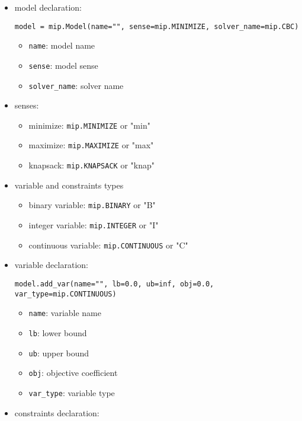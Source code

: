 \documentclass[english]{article}
\begin{document}
\begin{itemize}
  \item model declaration:
        \begin{verbatim}
model = mip.Model(name="", sense=mip.MINIMIZE, solver_name=mip.CBC)
\end{verbatim}
        \begin{itemize}
          \item \texttt{name}: model name
          \item \texttt{sense}: model sense
          \item \texttt{solver\_name}: solver name
        \end{itemize}
  \item senses:
        \begin{itemize}
          \item minimize: \texttt{mip.MINIMIZE} or "min"
          \item maximize: \texttt{mip.MAXIMIZE} or "max"
          \item knapsack: \texttt{mip.KNAPSACK} or "knap"
        \end{itemize}
  \item variable and constraints types
        \begin{itemize}
          \item binary variable: \texttt{mip.BINARY} or "B"
          \item integer variable: \texttt{mip.INTEGER} or "I"
          \item continuous variable: \texttt{mip.CONTINUOUS} or "C"
        \end{itemize}
  \item variable declaration:
        \begin{verbatim}
model.add_var(name="", lb=0.0, ub=inf, obj=0.0, var_type=mip.CONTINUOUS)
  \end{verbatim}
        \begin{itemize}
          \item \texttt{name}: variable name
          \item \texttt{lb}: lower bound
          \item \texttt{ub}: upper bound
          \item \texttt{obj}: objective coefficient
          \item \texttt{var\_type}: variable type
        \end{itemize}
  \item constraints declaration:
        \begin{verbatim}

\end{verbatim}
\end{itemize}
\end{document}
